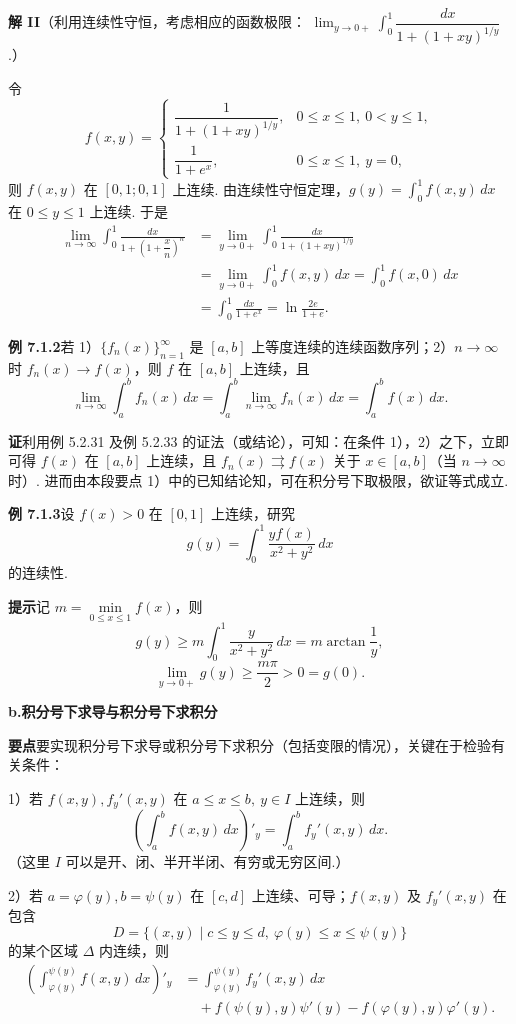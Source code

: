 \documentclass[UTF8,12pt,a4paper,fontset=fandol]{ctexart}
\begin{document}
\noindent\textbf{解 II}\quad （利用连续性守恒，考虑相应的函数极限：
$\displaystyle\lim_{y\to0+}\int_0^1\dfrac{dx}{1+(1+xy)^{1/y}}$.）

令
\[
f(x,y)=
\begin{cases}
\dfrac1{1+(1+xy)^{1/y}}, & 0\le x\le1,\ 0<y\le1,\\[0.8em]
\dfrac1{1+e^x}, & 0\le x\le1,\ y=0,
\end{cases}
\]
则 $f(x,y)$ 在 $[0,1;0,1]$ 上连续. 由连续性守恒定理，$g(y)=\displaystyle\int_0^1f(x,y)\,dx$ 在 $0\le y\le1$ 上连续. 于是
\[
\begin{aligned}
\lim_{n\to\infty}\int_0^1\frac{dx}{1+\left(1+\dfrac{x}{n}\right)^n}
&=\lim_{y\to0+}\int_0^1\frac{dx}{1+(1+xy)^{1/y}}\\
&=\lim_{y\to0+}\int_0^1f(x,y)\,dx
=\int_0^1f(x,0)\,dx\\
&=\int_0^1\frac{dx}{1+e^x}
=\ln\frac{2e}{1+e}.
\end{aligned}
\]

\noindent\textbf{例 7.1.2}\quad 若 1）$\{f_n(x)\}_{n=1}^{\infty}$ 是 $[a,b]$ 上等度连续的连续函数序列；2）$n\to\infty$ 时 $f_n(x)\to f(x)$，则 $f$ 在 $[a,b]$ 上连续，且
\[
\lim_{n\to\infty}\int_a^b f_n(x)\,dx
=\int_a^b \lim_{n\to\infty}f_n(x)\,dx
=\int_a^b f(x)\,dx.
\]

\noindent\textbf{证}\quad 利用例 5.2.31 及例 5.2.33 的证法（或结论），可知：在条件 1），2）之下，立即可得 $f(x)$ 在 $[a,b]$ 上连续，且 $f_n(x)\rightrightarrows f(x)$ 关于 $x\in[a,b]$（当 $n\to\infty$ 时）. 进而由本段要点 1）中的已知结论知，可在积分号下取极限，欲证等式成立.

\noindent\textbf{例 7.1.3}\quad 设 $f(x)>0$ 在 $[0,1]$ 上连续，研究
\[
g(y)=\int_0^1\frac{yf(x)}{x^2+y^2}\,dx
\]
的连续性.

\noindent\textbf{提示}\quad 记 $m=\min\limits_{0\le x\le1}f(x)$，则
\[
g(y)\ge m\int_0^1\frac{y}{x^2+y^2}\,dx=m\arctan\frac1y,
\]
\[
\lim_{y\to0+}g(y)\ge\frac{m\pi}{2}>0=g(0).
\]

\noindent\textbf{b.\quad 积分号下求导与积分号下求积分}

\noindent\textbf{要点}\quad 要实现积分号下求导或积分号下求积分（包括变限的情况），关键在于检验有关条件：

1）若 $f(x,y),f_y'(x,y)$ 在 $a\le x\le b,\ y\in I$ 上连续，则
\[
\left(\int_a^b f(x,y)\,dx\right)'_y=\int_a^b f_y'(x,y)\,dx.
\]
（这里 $I$ 可以是开、闭、半开半闭、有穷或无穷区间.）

2）若 $a=\varphi(y), b=\psi(y)$ 在 $[c,d]$ 上连续、可导；$f(x,y)$ 及 $f_y'(x,y)$ 在包含
\[
D=\{(x,y)\mid c\le y\le d,\ \varphi(y)\le x\le\psi(y)\}
\]
的某个区域 $\Delta$ 内连续，则
\[
\begin{aligned}
\left(\int_{\varphi(y)}^{\psi(y)}f(x,y)\,dx\right)'_y
&=\int_{\varphi(y)}^{\psi(y)}f_y'(x,y)\,dx\\
&\quad+f(\psi(y),y)\psi'(y)-f(\varphi(y),y)\varphi'(y).
\end{aligned}
\]
\end{document}
